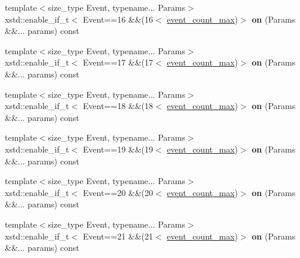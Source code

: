 \begin{DoxyCompactItemize}
\item 
\mbox{\label{classgko_1_1log_1_1Logger_a52eb1c5071294fe83bb31bbdc0243f2e}} 
{\footnotesize template$<$size\+\_\+type Event, typename... Params$>$ }\\xstd\+::enable\+\_\+if\+\_\+t$<$ Event==16 \&\&(16$<$ \hyperlink{classgko_1_1log_1_1Logger_a8794cd4bf2fd4d24ba9879bdca884dab}{event\+\_\+count\+\_\+max})$>$ {\bfseries on} (Params \&\&... params) const
\item 
\mbox{\label{classgko_1_1log_1_1Logger_aa6b5b79d7915d3c2fdf6d80d593db12b}} 
{\footnotesize template$<$size\+\_\+type Event, typename... Params$>$ }\\xstd\+::enable\+\_\+if\+\_\+t$<$ Event==17 \&\&(17$<$ \hyperlink{classgko_1_1log_1_1Logger_a8794cd4bf2fd4d24ba9879bdca884dab}{event\+\_\+count\+\_\+max})$>$ {\bfseries on} (Params \&\&... params) const
\item 
\mbox{\label{classgko_1_1log_1_1Logger_a2c10b11dad07bf82c0aaef05b617de3e}} 
{\footnotesize template$<$size\+\_\+type Event, typename... Params$>$ }\\xstd\+::enable\+\_\+if\+\_\+t$<$ Event==18 \&\&(18$<$ \hyperlink{classgko_1_1log_1_1Logger_a8794cd4bf2fd4d24ba9879bdca884dab}{event\+\_\+count\+\_\+max})$>$ {\bfseries on} (Params \&\&... params) const
\item 
\mbox{\label{classgko_1_1log_1_1Logger_ae834c9b141b6591d4119dd4becf092a6}} 
{\footnotesize template$<$size\+\_\+type Event, typename... Params$>$ }\\xstd\+::enable\+\_\+if\+\_\+t$<$ Event==19 \&\&(19$<$ \hyperlink{classgko_1_1log_1_1Logger_a8794cd4bf2fd4d24ba9879bdca884dab}{event\+\_\+count\+\_\+max})$>$ {\bfseries on} (Params \&\&... params) const
\item 
\mbox{\label{classgko_1_1log_1_1Logger_a5877e045bfb4e7883ca4a2f66ea9898c}} 
{\footnotesize template$<$size\+\_\+type Event, typename... Params$>$ }\\xstd\+::enable\+\_\+if\+\_\+t$<$ Event==20 \&\&(20$<$ \hyperlink{classgko_1_1log_1_1Logger_a8794cd4bf2fd4d24ba9879bdca884dab}{event\+\_\+count\+\_\+max})$>$ {\bfseries on} (Params \&\&... params) const
\item 
\mbox{\label{classgko_1_1log_1_1Logger_a840743e04db4e1cb7599fa7a25824bbf}} 
{\footnotesize template$<$size\+\_\+type Event, typename... Params$>$ }\\xstd\+::enable\+\_\+if\+\_\+t$<$ Event==21 \&\&(21$<$ \hyperlink{classgko_1_1log_1_1Logger_a8794cd4bf2fd4d24ba9879bdca884dab}{event\+\_\+count\+\_\+max})$>$ {\bfseries on} (Params \&\&... params) const
\end{DoxyCompactItemize}
